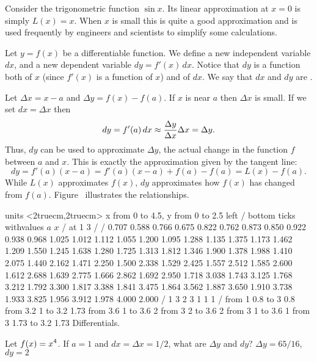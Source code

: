 \example\relax
{}
Consider the trigonometric function $\sin x$. Its linear approximation
at $x=0$ is simply $L(x)=x$. When $x$ is small this is quite a good
approximation and is used frequently by engineers and scientists
to simplify some calculations.
\endexample

 Let $y=f(x)$ be a differentiable function. We define a new
  independent variable $dx$, and a new dependent variable
  $dy=f'(x)\,dx$. Notice that $dy$ is a function both of $x$ (since
  $f'(x)$ is a function of $x$) and of $dx$.  We say that $dx$ and
  $dy$ are .  
\enddef

Let $\Delta x =x-a$ and $\Delta y= f(x)-f(a)$.
If $x$ is near $a$ then $\Delta x$ is small. If we set
$dx=\Delta x$ then 
$$dy = f'(a)\,dx \approx {\Delta y\over\Delta x}\Delta x = \Delta y.$$
Thus, $dy$ can be used to approximate $\Delta y$, the actual change in
the function $f$ between $a$ and $x$. This is exactly the
approximation given by the tangent line:
$$dy = f'(a)(x-a) = f'(a)(x-a)+f(a)-f(a)=L(x)-f(a).$$
While $L(x)$ approximates $f(x)$, $dy$ approximates how $f(x)$ has
changed from $f(a)$.
Figure~ illustrates the relationships.

\figure
\texonly
\vbox{\beginpicture
\normalgraphs
\sevenpoint
\setcoordinatesystem units <2truecm,2truecm>
\setplotarea x from 0 to 4.5, y from 0 to 2.5
\axis left /
\axis bottom ticks withvalues {$a$} {$x$} / at 1 3 / /
 0.707 0.588 0.766 0.675 0.822 0.762 0.873 0.850 0.922 
0.938 0.968 1.025 1.012 1.112 1.055 1.200 1.095 1.288 1.135 
1.375 1.173 1.462 1.209 1.550 1.245 1.638 1.280 1.725 1.313 
1.812 1.346 1.900 1.378 1.988 1.410 2.075 1.440 2.162 1.471 
2.250 1.500 2.338 1.529 2.425 1.557 2.512 1.585 2.600 1.612 
2.688 1.639 2.775 1.666 2.862 1.692 2.950 1.718 3.038 1.743 
3.125 1.768 3.212 1.792 3.300 1.817 3.388 1.841 3.475 1.864 
3.562 1.887 3.650 1.910 3.738 1.933 3.825 1.956 3.912 1.978 
4.000 2.000 /
\setlinear
{} 1 3 2 3 1 1 1 /
 from 1 0.8 to 3 0.8
 from 3.2 1 to 3.2 1.73
 from 3.6 1 to 3.6 2
\setdashes <2pt>
\putrule from 3 2 to 3.6 2
\putrule from 3 1 to 3.6 1
\putrule from 3 1.73 to 3.2 1.73
\endpicture}
\endtexonly
{}
\begincaption
Differentials.
\endcaption
\endfigure

\exercises

\exercise Let $\displaystyle f(x) = x^4$. If $a=1$ and $dx= \Delta x =1/2$, 
what are $\Delta y$ and $dy$?
\answer $\Delta y=65/16$, $dy=2$
\endanswer
\endexercise

